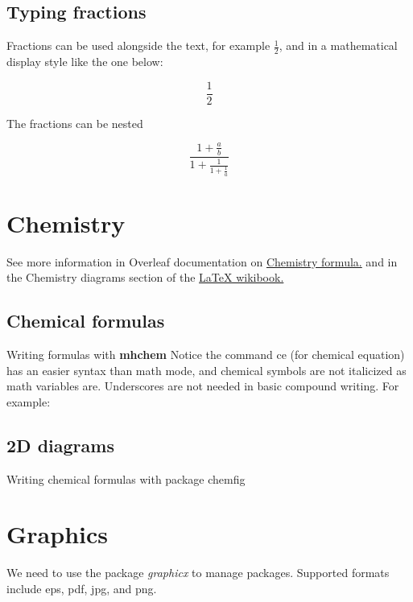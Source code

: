 \documentclass{article}
\begin{document}
\subsection{Typing fractions}
Fractions can be used alongside the text, for
example \( \frac{1}{2} \), and in a mathematical
display style like the one below:

\[\frac{1}{2}\]

The fractions can be nested

\[ \frac{1+\frac{a}{b}}{1+\frac{1}{1+\frac{1}{a}}} \]


\section{Chemistry}
See more information in Overleaf documentation on \href{https://www.overleaf.com/learn/latex/Chemistry_formulae}{Chemistry formula.} and in the Chemistry diagrams section of the \href{https://en.wikibooks.org/wiki/LaTeX/Chemical_Graphics}{LaTeX wikibook.}

\subsection{Chemical formulas}

Writing formulas with \textbf{mhchem}
Notice the command ce (for chemical equation) has an easier syntax than math mode, and chemical symbols are not italicized as math variables are.  Underscores are not needed in basic compound writing. For example:







\subsection{2D diagrams}
Writing chemical formulas with package chemfig





\section{Graphics}
We need to use the package \textit{graphicx} to manage packages.  Supported formats include eps, pdf, jpg, and png.
\end{document}

